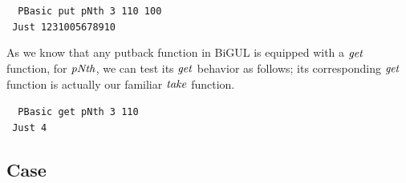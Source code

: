 \begin{tabbing}\tt
~PBasic~put~pNth~3~110~100\\
\tt ~Just~1231005678910
\end{tabbing}
As we know that any putback function in BiGUL is equipped with
a \ensuremath{\Varid{get}} function, for \ensuremath{\Varid{pNth}}, we can test its \ensuremath{\Varid{get}} behavior
as follows; its corresponding \ensuremath{\Varid{get}} function is actually
our familiar \ensuremath{\Varid{take}} function.
\begin{tabbing}\tt
~PBasic~get~pNth~3~110\\
\tt ~Just~4
\end{tabbing}

\subsection{Case}

